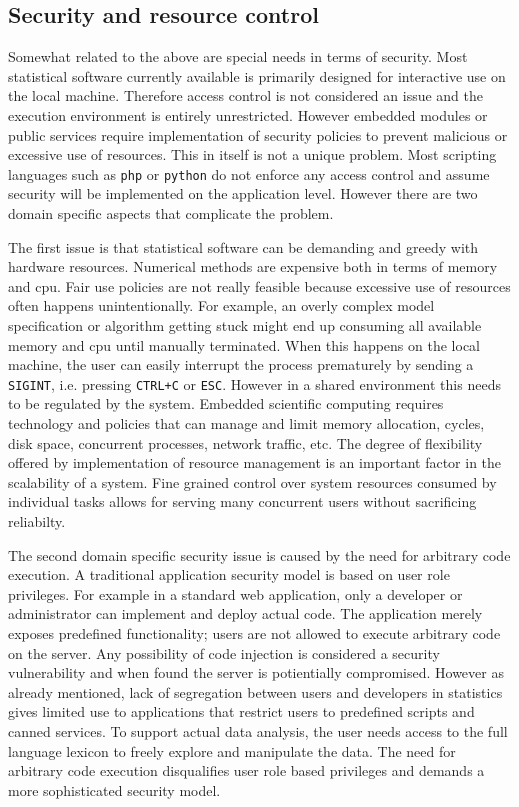 \subsection{Security and resource control}

Somewhat related to the above are special needs in terms of security. Most statistical software currently available is primarily designed for interactive use on the local machine. Therefore access control is not considered an issue and the execution environment is entirely unrestricted. However embedded modules or public services require implementation of security policies to prevent malicious or excessive use of resources. This in itself is not a unique problem. Most scripting languages such as \texttt{php} or \texttt{python} do not enforce any access control and assume security will be implemented on the application level. However there are two domain specific aspects that complicate the problem. 

The first issue is that statistical software can be demanding and greedy with hardware resources. Numerical methods are expensive both in terms of memory and cpu. Fair use policies are not really feasible because excessive use of resources often happens unintentionally. For example, an overly complex model specification or algorithm getting stuck might end up consuming all available memory and cpu until manually terminated. When this happens on the local machine, the user can easily interrupt the process prematurely by sending a \texttt{SIGINT}, i.e. pressing \texttt{CTRL+C} or \texttt{ESC}. However in a shared environment this needs to be regulated by the system. Embedded scientific computing requires technology and policies that can manage and limit memory allocation, cycles, disk space, concurrent processes, network traffic, etc. The degree of flexibility offered by implementation of resource management is an important factor in the scalability of a system. Fine grained control over system resources consumed by individual tasks allows for serving many concurrent users without sacrificing reliabilty. 

The second domain specific security issue is caused by the need for arbitrary code execution. A traditional application security model is based on user role privileges. For example in a standard web application, only a developer or administrator can implement and deploy actual code. The application merely exposes predefined functionality; users are not allowed to execute arbitrary code on the server. Any possibility of code injection is considered a security vulnerability and when found the server is potientially compromised. However as already mentioned, lack of segregation between users and developers in statistics gives limited use to applications that restrict users to predefined scripts and canned services. To support actual data analysis, the user needs access to the full language lexicon to freely explore and manipulate the data. The need for arbitrary code execution disqualifies user role based privileges and demands a more sophisticated security model. 


